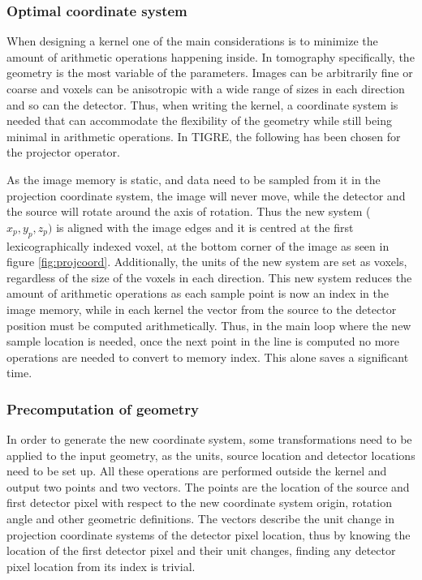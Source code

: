 \subsubsection{Optimal coordinate system}

When designing a kernel one of the main considerations is to minimize the amount of arithmetic operations happening inside. In tomography specifically, the geometry is the most variable of the parameters. Images can be arbitrarily fine or coarse and voxels can be anisotropic with a wide range of sizes in each direction and so can the detector. Thus, when writing the kernel, a coordinate system is needed that can accommodate the flexibility of the geometry while still being minimal in arithmetic operations. In TIGRE, the following has been chosen for the projector operator.

As the image memory is static, and data need to be sampled from it in the projection coordinate system, the image will never move, while the detector and the source will rotate around the axis of rotation. Thus the new system ($x_p,y_p,z_p)$ is aligned with the image edges and it is centred at the first lexicographically indexed voxel, at the bottom corner of the image as seen in figure \ref{fig:projcoord}.  Additionally, the units of the new system are set as voxels, regardless of the size of the voxels in each direction. This new system reduces the amount of arithmetic operations as each sample point is now an index in the image memory, while in each kernel the vector from the source to the detector position must be computed arithmetically. Thus, in the main loop where the new sample location is needed, once the next point in the line is computed no more operations are needed to convert to memory index. This alone saves a significant time.


\subsubsection{Precomputation of geometry}

In order to generate the new coordinate system, some transformations need to be applied to the input geometry, as the units, source location and detector locations need to be set up. All these operations are performed outside the kernel and output two points and two vectors. The points are the location of the source and first detector pixel with respect to the new coordinate system origin, rotation angle and other geometric definitions. The vectors describe the unit change in projection coordinate systems of the detector pixel location, thus by knowing the location of the first detector pixel and their unit changes, finding any detector pixel location from its index is trivial.

